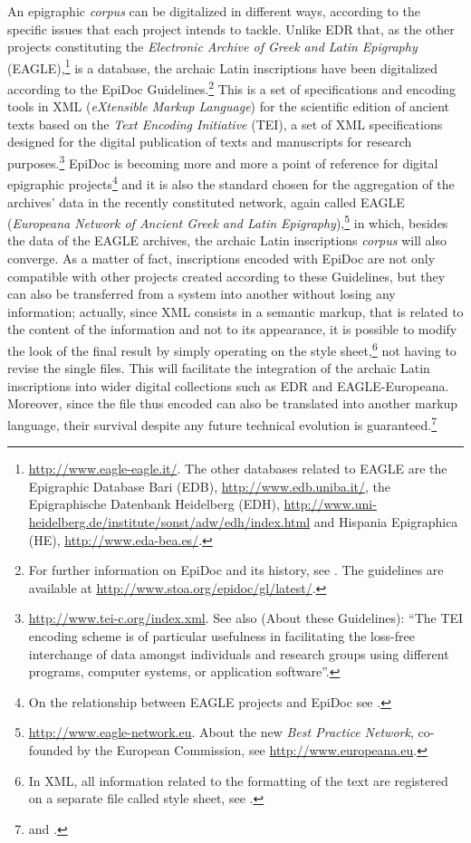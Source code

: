 \documentclass[amsthm,ebook]{saparticle}
\begin{document}
\noindent An epigraphic \emph{corpus} can be digitalized in different ways, according to the specific issues that each project intends to
tackle. Unlike EDR that, as the other projects constituting the \emph{Electronic Archive of Greek and Latin Epigraphy}
(EAGLE),\footnote{\url{http://www.eagle-eagle.it/}. The other databases related to EAGLE are the Epigraphic Database Bari
(EDB), \url{http://www.edb.uniba.it/}, the Epigraphische Datenbank Heidelberg (EDH),
\url{http://www.uni-heidelberg.de/institute/sonst/adw/edh/index.html} and Hispania Epigraphica (HE),
\url{http://www.eda-bea.es/}.} is a database, the archaic Latin inscriptions have been digitalized according to the EpiDoc
Guidelines.\footnote{For further information on EpiDoc and its history, see \citet{Elliot:2006aa}.
The guidelines are available at \url{http://www.stoa.org/epidoc/gl/latest/}.} This is a set of specifications and encoding
tools in XML (\emph{eXtensible Markup Language}) for the scientific edition of ancient texts based on the \emph{Text Encoding Initiative} (TEI), a set of XML specifications designed for the digital publication of texts and manuscripts for
research purposes.\footnote{\url{http://www.tei-c.org/index.xml}. See also \citet{Consortium:2008aa} (About these Guidelines):
``The TEI encoding scheme is of particular usefulness in facilitating the loss-free interchange of data amongst
individuals and research groups using different programs, computer systems, or application software''.} EpiDoc is
becoming more and more a point of reference for digital epigraphic projects\footnote{On the relationship between EAGLE
projects and EpiDoc see \citet{felle_esperienze_2012}.} and it is also the standard chosen for the aggregation of the archives' data in
the recently constituted network, again called EAGLE (\emph{Europeana Network of Ancient Greek and Latin
Epigraphy}),\footnote{\url{http://www.eagle-network.eu}. About the new \emph{Best Practice Network}, co-founded by the European
Commission, see \url{http://www.europeana.eu}.} in which, besides the data of the EAGLE archives, the archaic Latin
inscriptions \emph{corpus} will also converge. As a matter of fact, inscriptions encoded with EpiDoc are not only compatible
with other projects created according to these Guidelines, but they can also be transferred from a system into another
without losing any information; actually, since XML consists in a semantic markup, that is related to the content of
the information and not to its appearance, it is possible to modify the look of the final result by simply operating on
the style sheet,\footnote{In XML, all information related to the formatting of the text are registered on a separate
file called style sheet, see \citet[104, 110-111]{bodard_epidoc:_2009}.} not having to revise the single files. This will facilitate
the integration of the archaic Latin inscriptions into wider digital collections such as EDR and EAGLE-Europeana.
Moreover, since the file thus encoded can also be translated into another markup language, their survival despite any
future technical evolution is guaranteed.\footnote{\citet[37-38]{tissoni_epidoc_2008} and \citet[104-105]{bodard_epidoc:_2009}.}
\end{document}
